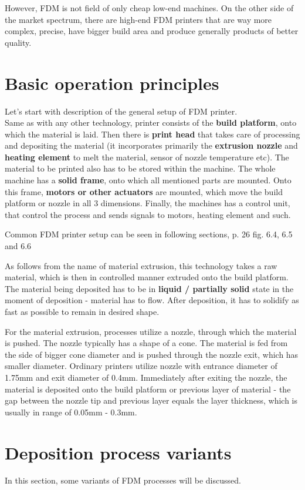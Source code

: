 \documentclass[a4paper, twoside, 11pt]{report}
\begin{document}
	However, FDM is not field of only cheap low-end machines. On the other side of the market spectrum, there are high-end FDM printers that are way more complex, precise, have bigger build area and produce generally products of better quality.

\section{Basic operation principles}
Let's start with description of the general setup of FDM printer.\\
	Same as with any other technology, printer consists of the \textbf{build platform}, onto which the material is laid. Then there is \textbf{print head} that takes care of processing and depositing the material (it incorporates primarily the \textbf{extrusion nozzle} and \textbf{heating element} to melt the material, sensor of nozzle temperature etc). The material to be printed also has to be stored within the machine. The whole machine has a \textbf{solid frame}, onto which all mentioned parts are mounted. Onto this frame, \textbf{motors or other actuators} are mounted, which move the build platform or nozzle in all 3 dimensions. Finally, the machines has a control unit, that control the process and sends signals to motors, heating element and such.
	
	Common FDM printer setup can be seen in following sections, p. 26 fig. 6.4, 6.5 and 6.6
	
	As follows from the name of material extrusion, this technology takes a raw material, which is then in controlled manner extruded onto the build platform. The material being deposited has to be in \textbf{liquid / partially solid} state in the moment of deposition - material has to flow. After deposition, it has to solidify as fast as possible to remain in desired shape.
	
	For the material extrusion, processes utilize a nozzle, through which the material is pushed. The nozzle typically has a shape of a cone. The material is fed from the side of bigger cone diameter and is pushed through the nozzle exit, which has smaller diameter. Ordinary printers utilize nozzle with entrance diameter of 1.75mm and exit diameter of 0.4mm. Immediately after exiting the nozzle, the material is deposited onto the build platform or previous layer of material - the gap between the nozzle tip and previous layer equals the layer thickness, which is usually in range of 0.05mm - 0.3mm.

\section{Deposition process variants}
In this section, some variants of FDM processes will be discussed.
\end{document}
